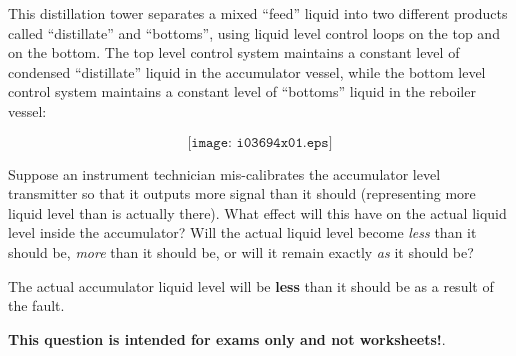 

This distillation tower separates a mixed ``feed'' liquid into two different products called ``distillate'' and ``bottoms'', using liquid level control loops on the top and on the bottom.  The top level control system maintains a constant level of condensed ``distillate'' liquid in the accumulator vessel, while the bottom level control system maintains a constant level of ``bottoms'' liquid in the reboiler vessel:

$$\texttt{[image: i03694x01.eps]}$$

Suppose an instrument technician mis-calibrates the accumulator level transmitter so that it outputs more signal than it should (representing more liquid level than is actually there).  What effect will this have on the actual liquid level inside the accumulator?  Will the actual liquid level become {\it less} than it should be, {\it more} than it should be, or will it remain exactly {\it as} it should be?







The actual accumulator liquid level will be {\bf less} than it should be as a result of the fault.







{\bf This question is intended for exams only and not worksheets!}.



